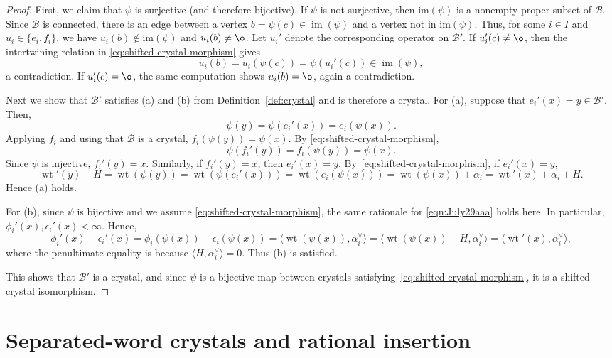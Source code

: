 \documentclass[12pt]{amsart}
\DeclareMathOperator{\wt}{wt}
\theoremstyle{definition}
\theoremstyle{remark}
\begin{document}
\begin{proof}
First, we claim that $\psi$ is surjective (and therefore bijective). 
If $\psi$ is not surjective, then $\text{im}(\psi)$ is a nonempty proper subset of $\mathcal B$. 
Since $\mathcal B$ is connected, there is an edge between a vertex $b=\psi(c)\in\operatorname{im}(\psi)$ and a vertex not in $\text{im}(\psi)$. 
Thus, for some $i\in I$ and $u_i\in\{e_i,f_i\}$, we have
$u_i(b)\notin \text{im}(\psi)$ and $u_i(b)\neq \o$. 
Let $u_i'$ denote the corresponding operator on ${\mathcal B}'$. 
If $u_i'(c)\neq \o$, then the intertwining relation in \eqref{eq:shifted-crystal-morphism} gives
\[
u_i(b)=u_i(\psi(c))=\psi(u_i'(c))\in \operatorname{im}(\psi),
\]
a contradiction. If $u_i'(c)=\o$, the same computation shows $u_i(b)=\o$, again a contradiction.

Next we show that $\mathcal{B'}$ satisfies (a) and (b) from Definition~\ref{def:crystal}
and is therefore a crystal. For (a), suppose that $e_i'(x)=y\in\mathcal{B}'$. Then,
\[
\psi(y)=\psi(e_i'(x))=e_i(\psi(x)).
\]
Applying $f_i$ and using that $\mathcal B$ is a crystal,
$f_i(\psi(y))=\psi(x)$.
By \eqref{eq:shifted-crystal-morphism},
\[
\psi(f_i'(y))=f_i(\psi(y))=\psi(x).
\]
Since $\psi$ is injective, $f_i'(y)=x$.
Similarly, if $f_i'(y)=x$, then $e_i'(x)=y$.
By~\eqref{eq:shifted-crystal-morphism}, if $e_i'(x) = y$, 
\[
\wt'(y)+H = \wt(\psi(y)) = \wt(\psi(e_i'(x))) = \wt(e_i(\psi(x))) = \wt(\psi(x)) + \alpha_i = \wt'(x) + \alpha_i+H.
\]
Hence (a) holds. 

For (b), since $\psi$ is bijective and we assume \eqref{eq:shifted-crystal-morphism}, the same
rationale for \eqref{eqn:July29aaa} holds here. In particular, 
$\phi_i'(x), \epsilon_i'(x)<\infty$. Hence,
\[
\phi_i'(x)-\epsilon_i'(x)
=\phi_i(\psi(x))-\epsilon_i(\psi(x))  
=\langle \wt(\psi(x)),\alpha_i^\vee\rangle 
=\langle \wt(\psi(x))-H,\alpha_i^\vee\rangle 
=\langle \wt'(x),\alpha_i^\vee\rangle,
\]
where the penultimate equality is because $\langle H, \alpha_i^\vee\rangle = 0$. Thus (b) is satisfied.

This shows that $\mathcal{B}'$ is a crystal, and since $\psi$ is a bijective map between crystals satisfying~\eqref{eq:shifted-crystal-morphism}, it is a shifted crystal isomorphism.
\end{proof}


\section{Separated-word crystals and rational insertion}\label{sec:thetechproofs}
\end{document}
